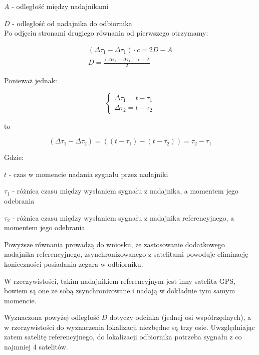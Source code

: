 $A$ - odległość między nadajnikami

$D$ - odległość od nadajnika do odbiornika\\

Po odjęciu stronami drugiego równania od pierwszego otrzymamy:

\begin{gather}
(\Delta \tau_1  - \Delta \tau_1) \cdot c = 2D - A \\
D = \frac{(\Delta \tau_1  - \Delta \tau_1) \cdot c + A}{2} \nonumber 
\end{gather}

Ponieważ jednak:

\begin{equation}
\begin{cases}
	\Delta \tau_1 = t - \tau_1 \\
	\Delta \tau_2 = t- \tau_2
\end{cases}
\end{equation}

to

\begin{equation}
(\Delta \tau_1 - \Delta \tau_2) = ((t - \tau_1) - (t - \tau_2)) = \tau_2 - \tau_1
\end{equation}

Gdzie:

$t$ - czas w momencie nadania sygnału przez nadajniki

$\tau_1$ - różnica czasu między wysłaniem sygnału z nadajnika, a momentem jego odebrania

$\tau_2$ - różnica czasu między wysłaniem sygnału z nadajnika referencyjnego, a momentem jego odebrania

Powyższe równania prowadzą do wniosku, że zastosowanie dodatkowego nadajnika referencyjnego, zsynchronizowanego z satelitami powoduje eliminację konieczności posiadania zegara w odbiorniku.

W rzeczywistości, takim nadajnikiem referencyjnym jest inny satelita GPS, bowiem są one ze sobą zsynchronizowane i nadają w dokładnie tym samym momencie.

Wyznaczona powyżej odległość $D$ dotyczy odcinka (jednej osi współrzędnych), a w rzeczywistości do wyznaczenia lokalizacji niezbędne są trzy osie. Uwzględniając zatem satelitę referencyjnego, do lokalizacji odbiornika potrzeba sygnału z co najmniej 4 satelitów.

